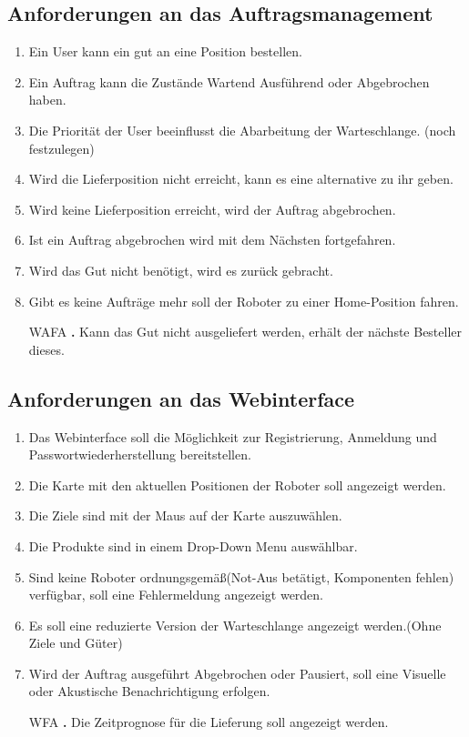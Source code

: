 \subsection{Anforderungen an das Auftragsmanagement}
\begin{enumerate}[nosep,style=sameline]
\renewcommand{\labelenumi}{ALFA \textbf{\theenumi.}}
\item Ein User kann ein gut an eine Position bestellen.
\item Ein Auftrag kann die Zustände Wartend Ausführend oder Abgebrochen haben.
\item Die Priorität der User beeinflusst die Abarbeitung der Warteschlange. (noch festzulegen)
\item Wird die Lieferposition nicht erreicht, kann es eine alternative zu ihr geben.
\item Wird keine Lieferposition erreicht, wird der Auftrag abgebrochen.
\item Ist ein Auftrag abgebrochen wird mit dem Nächsten fortgefahren.
\item Wird das Gut nicht benötigt, wird es zurück gebracht.
\item Gibt es keine Aufträge mehr soll der Roboter zu einer Home-Position fahren.
\item[WAFA \textbf{\theenumi.}]Kann das Gut nicht ausgeliefert werden, erhält der nächste Besteller dieses.

\end{enumerate}

\subsection{Anforderungen an das Webinterface}
\begin{enumerate}[nosep,style=sameline]
\renewcommand{\labelenumi}{WLFA \textbf{\theenumi.}}
\item Das Webinterface soll die Möglichkeit zur Registrierung, Anmeldung und Passwortwiederherstellung bereitstellen.
\item Die Karte mit den aktuellen Positionen der Roboter soll angezeigt werden.
\item Die Ziele sind mit der Maus auf der Karte auszuwählen.
\item Die Produkte sind in einem Drop-Down Menu auswählbar.
\item Sind keine Roboter ordnungsgemäß(Not-Aus betätigt, Komponenten fehlen)  verfügbar, soll eine Fehlermeldung angezeigt werden.
\item Es soll eine reduzierte Version der Warteschlange angezeigt werden.(Ohne Ziele und Güter)
\item Wird der Auftrag ausgeführt Abgebrochen oder Pausiert, soll eine Visuelle oder Akustische Benachrichtigung erfolgen.
\item[WFA \textbf{\theenumi.}] Die Zeitprognose für die Lieferung soll angezeigt werden.
\end{enumerate}

